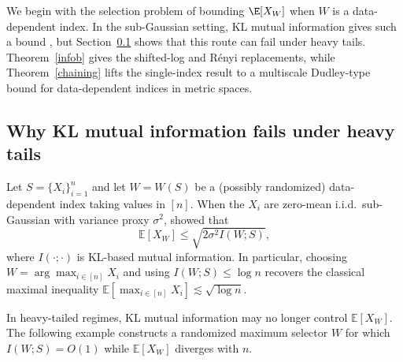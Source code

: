 \documentclass[11pt]{article}
\providecommand{\Renyi}{R\'enyi }
\begin{document}
We begin with the selection problem of bounding $\E[X_W]$ when $W$ is a
data-dependent index.  In the sub-Gaussian setting, KL mutual information gives
such a bound \citep{Russo20}, but Section~\ref{se:whyKLfails} shows that this
route can fail under heavy tails.  Theorem~\ref{infob} gives the shifted-log and R\'enyi replacements, while Theorem~\ref{chaining} lifts the
single-index result to a multiscale Dudley-type bound for data-dependent
indices in metric spaces.






\subsection{Why KL mutual information fails under heavy tails}\label{se:whyKLfails}

Let $S=\{X_i\}_{i=1}^n$ and let $W=W(S)$ be a (possibly randomized) data-dependent
index taking values in $[n]$.  When the $X_i$ are zero-mean i.i.d.\ sub-Gaussian
with variance proxy $\sigma^2$, \citet{Russo20} showed that
\begin{equation}\label{eq:Russo}
\mathbb{E}[X_W] \le \sqrt{2\sigma^2I(W;S)},
\end{equation}
where $I(\cdot;\cdot)$ is KL-based mutual information.  In particular,
choosing $W=\arg\max_{i\in[n]}X_i$ and using $I(W;S)\le \log n$ recovers the
classical maximal inequality
\(
\mathbb{E}[\max_{i\in[n]} X_i]\lesssim \sqrt{\log n}.
\)

In heavy-tailed regimes, KL mutual information may no longer control
$\mathbb{E}[X_W]$.  The following example constructs a randomized maximum
selector $W$ for which $I(W;S)=O(1)$ while $\mathbb{E}[X_W]$ diverges with $n$.
\end{document}
